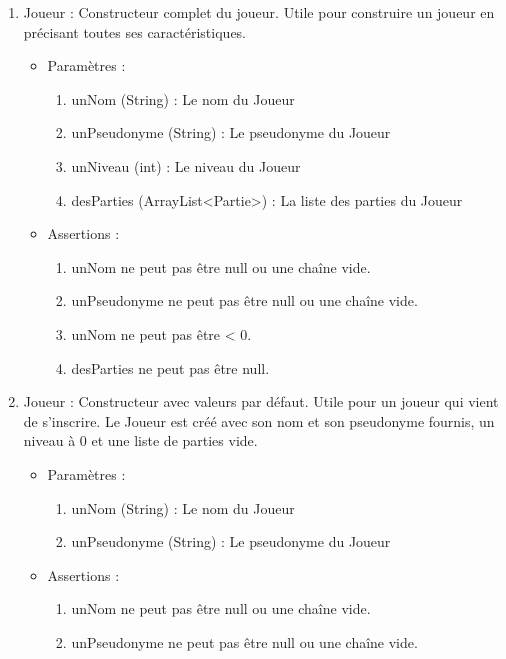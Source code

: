 \begin{itemize}
  \begin{enumerate}
  \item Joueur : Constructeur complet du joueur. Utile pour construire un joueur en précisant toutes ses caractéristiques.
    \begin{itemize}
    \item Paramètres : 
      \begin{enumerate}
      \item unNom (String) : Le nom du Joueur
      \item unPseudonyme (String) : Le pseudonyme du Joueur
      \item unNiveau (int) : Le niveau du Joueur
      \item desParties (ArrayList<Partie>) : La liste des parties du Joueur
      \end{enumerate}
    \item Assertions : 
      \begin{enumerate}
      \item unNom ne peut pas être null ou une chaîne vide.
      \item unPseudonyme ne peut pas être null ou une chaîne vide.
      \item unNom ne peut pas être < 0.
      \item desParties ne peut pas être null.
      \end{enumerate}
    \end{itemize}
  \item Joueur : Constructeur avec valeurs par défaut. Utile pour un joueur qui vient de s'inscrire. Le Joueur est créé avec son nom et son pseudonyme fournis, un niveau à 0 et une liste de parties vide.
    \begin{itemize}
    \item Paramètres : 
      \begin{enumerate}
      \item unNom (String) : Le nom du Joueur
      \item unPseudonyme (String) : Le pseudonyme du Joueur
      \end{enumerate}
    \item Assertions : 
      \begin{enumerate}
      \item unNom ne peut pas être null ou une chaîne vide.
      \item unPseudonyme ne peut pas être null ou une chaîne vide.
      \end{enumerate}
    \end{itemize}


\end{enumerate}
\end{itemize}
